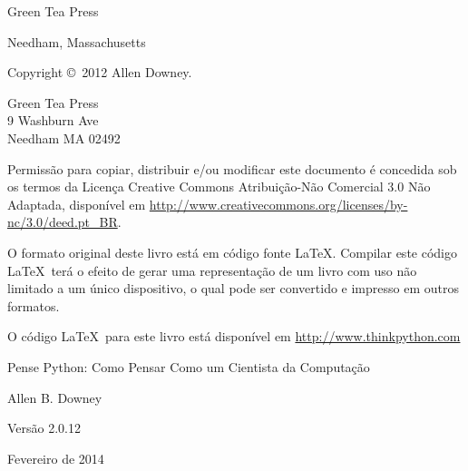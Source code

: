 \documentclass[10pt]{book}
\newcommand{\thetitle}{Pense Python: Como Pensar Como um Cientista da Computação}
\newcommand{\theversion}{2.0.12}
\newcommand{\thedate}{Fevereiro de 2014}
\begin{document}
\begin{latexonly}
\begin{flushright}
{\Large Green Tea Press}

{\small Needham, Massachusetts}

\vfill

\end{flushright}


\pagebreak
\thispagestyle{empty}

{\small
Copyright \copyright ~2012 Allen Downey.


\vspace{0.2in}

\begin{flushleft}
Green Tea Press       \\
9 Washburn Ave        \\
Needham MA 02492
\end{flushleft}

Permissão para copiar, distribuir e/ou modificar este documento é concedida
sob os termos da Licença Creative Commons Atribuição-Não Comercial 3.0 Não Adaptada,
 disponível em \url{http://www.creativecommons.org/licenses/by-nc/3.0/deed.pt_BR}.

O formato original deste livro está em código fonte \LaTeX. Compilar este
código \LaTeX\ terá o efeito de gerar uma representação de um livro
com uso não limitado a um único dispositivo, o qual pode ser convertido e impresso
em outros formatos.

O código \LaTeX\ para este livro está disponível em
\url{http://www.thinkpython.com}

\vspace{0.2in}

} %

\end{latexonly}



\begin{htmlonly}


{\Large \thetitle}

{\large Allen B. Downey}

Versão \theversion

\thedate

\setcounter{chapter}{-1}

\end{htmlonly}

\fi
\end{document}
